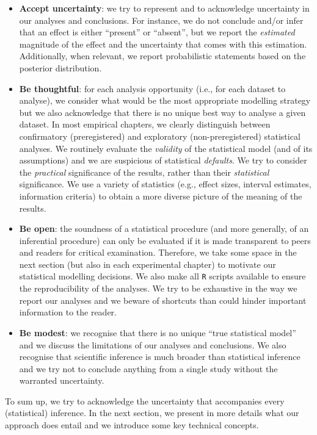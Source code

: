 \documentclass[a4paper,12pt,twoside,onecolumn,openright,final,oldfontcommands]{memoir}
\begin{document}
\begin{itemize}
\item
  \textbf{Accept uncertainty}: we try to represent and to acknowledge uncertainty in our analyses and conclusions. For instance, we do not conclude and/or infer that an effect is either \enquote{present} or \enquote{absent}, but we report the \emph{estimated} magnitude of the effect and the uncertainty that comes with this estimation. Additionally, when relevant, we report probabilistic statements based on the posterior distribution.
\item
  \textbf{Be thoughtful}: for each analysis opportunity (i.e., for each dataset to analyse), we consider what would be the most appropriate modelling strategy but we also acknowledge that there is no unique best way to analyse a given dataset. In most empirical chapters, we clearly distinguish between confirmatory (preregistered) and exploratory (non-preregistered) statistical analyses. We routinely evaluate the \emph{validity} of the statistical model (and of its assumptions) and we are suspicious of statistical \emph{defaults}. We try to consider the \emph{practical} significance of the results, rather than their \emph{statistical} significance. We use a variety of statistics (e.g., effect sizes, interval estimates, information criteria) to obtain a more diverse picture of the meaning of the results.
\item
  \textbf{Be open}: the soundness of a statistical procedure (and more generally, of an inferential procedure) can only be evaluated if it is made transparent to peers and readers for critical examination. Therefore, we take some space in the next section (but also in each experimental chapter) to motivate our statistical modelling decisions. We also make all \texttt{R} scripts available to ensure the reproducibility of the analyses. We try to be exhaustive in the way we report our analyses and we beware of shortcuts than could hinder important information to the reader.
\item
  \textbf{Be modest}: we recognise that there is no unique \enquote{true statistical model} and we discuss the limitations of our analyses and conclusions. We also recognise that scientific inference is much broader than statistical inference and we try not to conclude anything from a single study without the warranted uncertainty.
\end{itemize}

To sum up, we try to acknowledge the uncertainty that accompanies every (statistical) inference. In the next section, we present in more details what our approach does entail and we introduce some key technical concepts.
\end{document}
